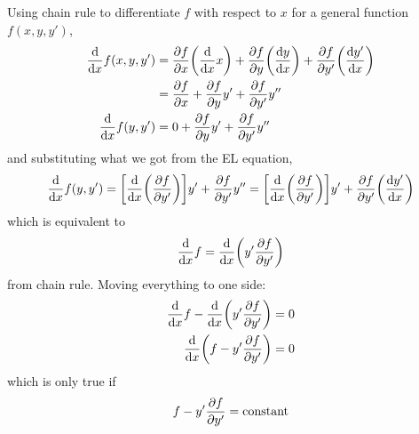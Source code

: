 \documentclass[../hw.tex]{subfiles}
\begin{document}
Using chain rule to differentiate $f$ with respect to $x$ for a general function $f(x, y, y')$,
\begin{align*}
    \dv{x}f(x, y, y') &= \pdv{f}{x} \qt(\dv{x} x) + \pdv{f}{y} \qt(\dv{y}{x})
        + \pdv{f}{y'} \qt(\dv{y'}{x}) \\
    &= \pdv{f}{x} + \pdv{f}{y}y' + \pdv{f}{y'}y'' \\
    \dv{x}f(y, y') &= 0 + \pdv{f}{y}y' + \pdv{f}{y'}y''
\end{align*}
and substituting what we got from the EL equation,
\begin{align*}
    \dv{x}f(y, y') = \qt[\dv{x}(\pdv{f}{y'})]y' + \pdv{f}{y'} y'' = \qt[\dv{x}(\pdv{f}{y'})]y'
        + \pdv{f}{y'} \qt(\dv{y'}{x})
\end{align*}
which is equivalent to 
\begin{align*}
    \dv{x}f = \dv{x}(y' \pdv{f}{y'})
\end{align*}
from chain rule. Moving everything to one side:
\begin{align*}
    \dv{x}f - \dv{x}(y' \pdv{f}{y'}) &= 0 \\
    \dv{x}(f - y' \pdv{f}{y'}) &= 0
\end{align*}
which is only true if 
\begin{align*}
    f - y' \pdv{f}{y'} = \mathrm{constant}
\end{align*}

\newpage
\end{document}
